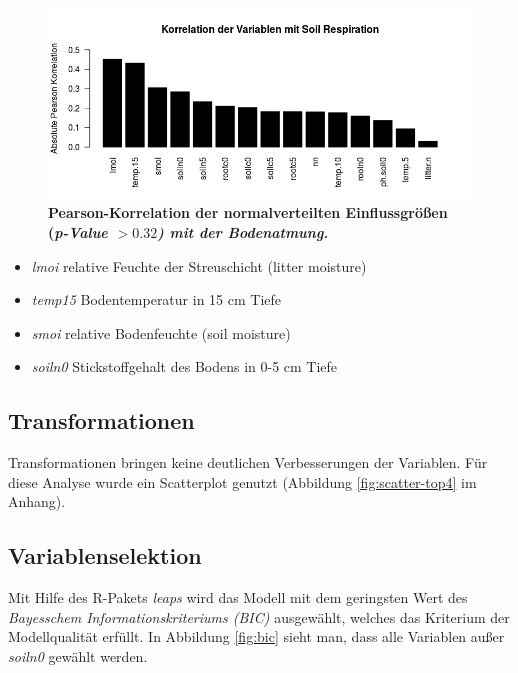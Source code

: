 \begin{figure}
	\centering
	\includegraphics[width=\textwidth]{fig/model/correlation-pearson-normal.png}
	\caption{\bf{Pearson-Korrelation} der normalverteilten Einflussgrößen (\it{p-Value} $> 0.32$) mit der Bodenatmung.}
    \label{fig:pearson}
\end{figure}

\begin{itemize}
\tightlist
\item
  \emph{lmoi} relative Feuchte der Streuschicht (litter moisture)
\item
  \emph{temp15} Bodentemperatur in 15 cm Tiefe
\item
  \emph{smoi} relative Bodenfeuchte (soil moisture)
\item
  \emph{soiln0} Stickstoffgehalt des Bodens in 0-5 cm Tiefe
\end{itemize}

\subsection{Transformationen}

Transformationen bringen keine deutlichen Verbesserungen der Variablen. Für diese Analyse wurde ein Scatterplot genutzt (Abbildung \ref{fig:scatter-top4} im Anhang).

\subsection{Variablenselektion}

Mit Hilfe des R-Pakets \emph{leaps} wird das Modell mit dem geringsten Wert des \emph{Bayesschem Informationskriteriums (BIC)} ausgewählt, welches das Kriterium der Modellqualität erfüllt.
In Abbildung \ref{fig:bic} sieht man, dass alle Variablen außer \emph{soiln0} gewählt werden. 



